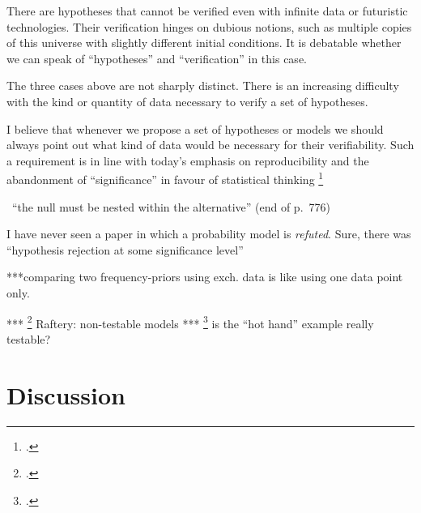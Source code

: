 \documentclass[\ifafour a4paper,12pt,\else a5paper,10pt,\fi%
onecolumn,oneside,article,%
british%
]{memoir}
\theoremstyle{remark}
\theoremstyle{innote}
\newcommand*{\citep}{\footcites}
\renewcommand*{\|}[1][]{\nonscript\,#1\vert\nonscript\;\mathopen{}}
\newcommand*{\sect}{\S}%
\newcommand*{\puzzle}{{\fontencoding{U}\fontfamily{fontawesometwo}\selectfont\symbol{225}}}
\newcommand{\mynote}[1]{ {\color{notecolour}\puzzle\ #1}}
\begin{document}
There are hypotheses that cannot be verified even with infinite data or
futuristic technologies. Their verification hinges on dubious notions, such
as multiple copies of this universe with slightly different initial
conditions. It is debatable whether we can speak of \enquote{hypotheses}
and \enquote{verification} in this case.

The three cases above are not sharply distinct. There is an increasing
difficulty with the kind or quantity of data necessary to verify a set of
hypotheses.

I believe that whenever we propose a set of hypotheses or models we should
always point out what kind of data would be necessary for their
verifiability. Such a requirement is in line with today's emphasis on
reproducibility and the abandonment of \enquote{significance} in favour of
statistical thinking \citep[\sect~1]{asa2019}


\mynote{\enquote{the null must be nested within the alternative} (end of p.~776)}






I have never seen a paper in which a probability model is \emph{refuted}.
Sure, there was \enquote{hypothesis rejection at some significance level}



***comparing two frequency-priors using exch. data is like using one data
point only.


*** \citep{rafteryetal1989} Raftery: non-testable models
*** \citep{kassetal1995} is the \enquote{hot hand} example really testable?

\section{Discussion}
\label{sec:discussion}
\end{document}
